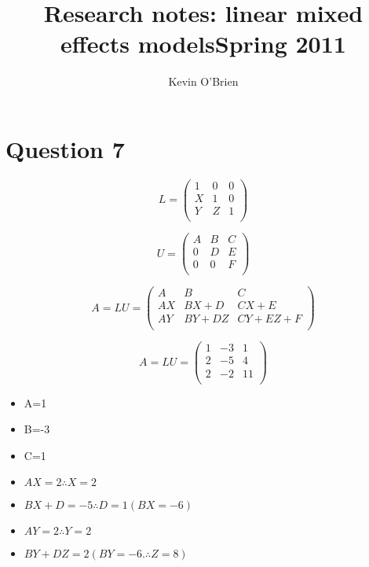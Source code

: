 \documentclass[12pt, a4paper]{report}
\title{Research notes: linear mixed effects models}
\author{ } \date{ }
\theoremstyle{plain}
\theoremstyle{definition}
\theoremstyle{remark}
\begin{document}
\author{Kevin O'Brien}
\title{Spring 2011}

\newpage
\section*{Question 7}

\[ L = \left(\begin{array}{ccc}
1&0&0\\
X&1&0\\
Y&Z&1\\
\end{array}\right)\]

\[ U = \left( \begin{array}{ccc}
A&B&C\\
0&D&E\\
0&0&F\\
\end{array}\right)\]

\[ A = L U= \left(\begin{array}{ccc}
A&B&C\\
AX&BX+D&CX+E\\
AY&BY+DZ&CY+EZ+F\\ 
\end{array}\right)\]


\[ A = L U=\left(\begin{array}{ccc}
1&-3&1\\
2&-5&4\\
2&-2&11\\
\end{array}\right)\]


\begin{itemize}
\item A=1
\item B=-3
\item C=1
\item $AX=2 \therefore X=2$
\item $BX+D=-5 \therefore D=1 (BX=-6)$
\item $AY=2 \therefore Y=2$
\item $BY+DZ=2 (BY=-6. \therefore Z=8)$
\end{itemize}
\end{document}
